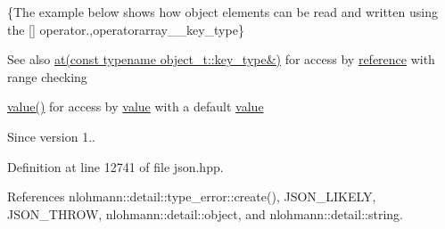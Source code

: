 \{The example below shows how object elements can be read and written using the {\ttfamily \mbox{[}\mbox{]}} operator.,operatorarray\+\_\+\+\_\+key\+\_\+type\}

\begin{DoxySeeAlso}{See also}
\hyperlink{classnlohmann_1_1basic__json_a93403e803947b86f4da2d1fb3345cf2c}{at(const typename object\+\_\+t\+::key\+\_\+type\&)} for access by \hyperlink{classnlohmann_1_1basic__json_ac6a5eddd156c776ac75ff54cfe54a5bc}{reference} with range checking 

\hyperlink{classnlohmann_1_1basic__json_adcf8ca5079f5db993820bf50036bf45d}{value()} for access by \hyperlink{classnlohmann_1_1basic__json_adcf8ca5079f5db993820bf50036bf45d}{value} with a default \hyperlink{classnlohmann_1_1basic__json_adcf8ca5079f5db993820bf50036bf45d}{value}
\end{DoxySeeAlso}
\begin{DoxySince}{Since}
version 1.. 
\end{DoxySince}


Definition at line 12741 of file json.\+hpp.



References nlohmann\+::detail\+::type\+\_\+error\+::create(), J\+S\+O\+N\+\_\+\+L\+I\+K\+E\+LY, J\+S\+O\+N\+\_\+\+T\+H\+R\+OW, nlohmann\+::detail\+::object, and nlohmann\+::detail\+::string.


